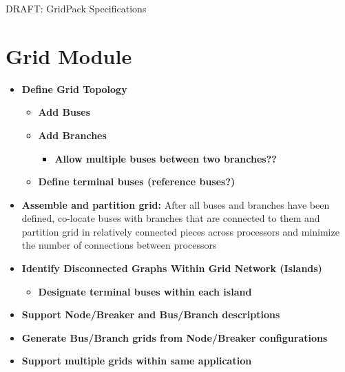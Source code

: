 \documentclass[12pt]{article}
\begin{document}
\begin{titlepage}
\begin{center}
{\LARGE DRAFT: GridPack Specifications}
\end{center}
\end{titlepage}
\newpage
\pagestyle{plain}
\section{Grid Module}
\begin{itemize}
\item{\bf Define Grid Topology}
\begin{itemize}
\item{\bf Add Buses}
\item{\bf Add Branches}
\begin{itemize}
\item{\bf Allow multiple buses between two branches??}
\end{itemize}
\item{\bf Define terminal buses (reference buses?)}
\end{itemize}
\item{\bf Assemble and partition grid:} After all buses and branches have
been defined, co-locate buses with branches that are connected to them and
partition grid in relatively connected pieces across processors and minimize the
number of connections between processors
\item{\bf Identify Disconnected Graphs Within Grid Network (Islands)}
\begin{itemize}
\item{\bf Designate terminal buses within each island}
\end{itemize}
\item{\bf Support Node/Breaker and Bus/Branch descriptions}
\item{\bf Generate Bus/Branch grids from Node/Breaker configurations}
\item{\bf Support multiple grids within same application}
\end{itemize}
\end{document}
